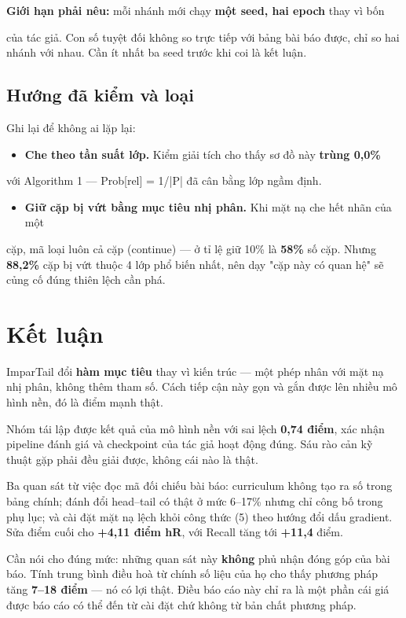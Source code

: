 \documentclass[11pt,a4paper]{article}
\newcommand{\code}[1]{{\ttfamily\small\color{codetext}#1}}
\begin{document}
\textbf{Giới hạn phải nêu:} mỗi nhánh mới chạy \textbf{một seed, hai epoch} thay vì bốn

của tác giả. Con số tuyệt đối không so trực tiếp với bảng bài báo được, chỉ so hai nhánh với nhau. Cần ít nhất ba seed trước khi coi là kết luận.

\subsection{Hướng đã kiểm và loại}
Ghi lại để không ai lặp lại:

\begin{itemize}\itemsep2pt
\item \textbf{Che theo tần suất lớp.} Kiểm giải tích cho thấy sơ đồ này \textbf{trùng 0,0\%}
\end{itemize}
với Algorithm 1 --- \code{Prob[rel] = 1/|P|} đã cân bằng lớp ngầm định.

\begin{itemize}\itemsep2pt
\item \textbf{Giữ cặp bị vứt bằng mục tiêu nhị phân.} Khi mặt nạ che hết nhãn của một
\end{itemize}
cặp, mã loại luôn cả cặp (\code{continue}) --- ở tỉ lệ giữ 10\% là \textbf{58\%} số cặp. Nhưng \textbf{88,2\%} cặp bị vứt thuộc 4 lớp phổ biến nhất, nên dạy "cặp này có quan hệ" sẽ củng cố đúng thiên lệch cần phá.

\section{Kết luận}
ImparTail đổi \textbf{hàm mục tiêu} thay vì kiến trúc --- một phép nhân với mặt nạ nhị phân, không thêm tham số. Cách tiếp cận này gọn và gắn được lên nhiều mô hình nền, đó là điểm mạnh thật.

Nhóm tái lập được kết quả của mô hình nền với sai lệch \textbf{0,74 điểm}, xác nhận pipeline đánh giá và checkpoint của tác giả hoạt động đúng. Sáu rào cản kỹ thuật gặp phải đều giải được, không cái nào là thật.

Ba quan sát từ việc đọc mã đối chiếu bài báo: curriculum không tạo ra số trong bảng chính; đánh đổi head--tail có thật ở mức 6--17\% nhưng chỉ công bố trong phụ lục; và cài đặt mặt nạ lệch khỏi công thức (5) theo hướng đổi dấu gradient. Sửa điểm cuối cho \textbf{+4,11 điểm hR}, với Recall tăng tới \textbf{+11,4} điểm.

Cần nói cho đúng mức: những quan sát này \textbf{không} phủ nhận đóng góp của bài báo. Tính trung bình điều hoà từ chính số liệu của họ cho thấy phương pháp tăng \textbf{7--18 điểm} --- nó có lợi thật. Điều báo cáo này chỉ ra là một phần cái giá được báo cáo có thể đến từ cài đặt chứ không từ bản chất phương pháp.
\end{document}
